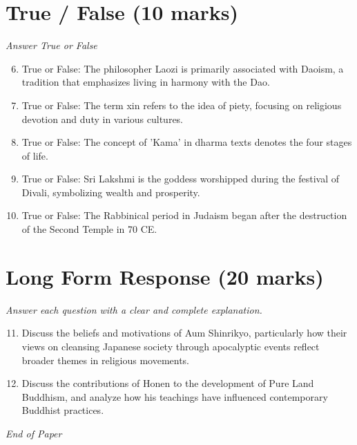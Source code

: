 \documentclass[12pt]{article}
\begin{document}
\section*{True / False (10 marks)}
\textit{Answer True or False}
\begin{enumerate}[label=\arabic*.]
\setcounter{enumi}{5}
\item True or False: The philosopher Laozi is primarily associated with Daoism, a tradition that emphasizes living in harmony with the Dao.
\item True or False: The term xin refers to the idea of piety, focusing on religious devotion and duty in various cultures.
\item True or False: The concept of 'Kama' in dharma texts denotes the four stages of life.
\item True or False: Sri Lakshmi is the goddess worshipped during the festival of Divali, symbolizing wealth and prosperity.
\item True or False: The Rabbinical period in Judaism began after the destruction of the Second Temple in 70 CE.
\end{enumerate}

\section*{Long Form Response (20 marks)}
\textit{Answer each question with a clear and complete explanation.}
\begin{enumerate}[label=\arabic*.]
\setcounter{enumi}{10}
\item Discuss the beliefs and motivations of Aum Shinrikyo, particularly how their views on cleansing Japanese society through apocalyptic events reflect broader themes in religious movements.
\item Discuss the contributions of Honen to the development of Pure Land Buddhism, and analyze how his teachings have influenced contemporary Buddhist practices.
\end{enumerate}

\vfill
\noindent\textit{End of Paper}
\end{document}
